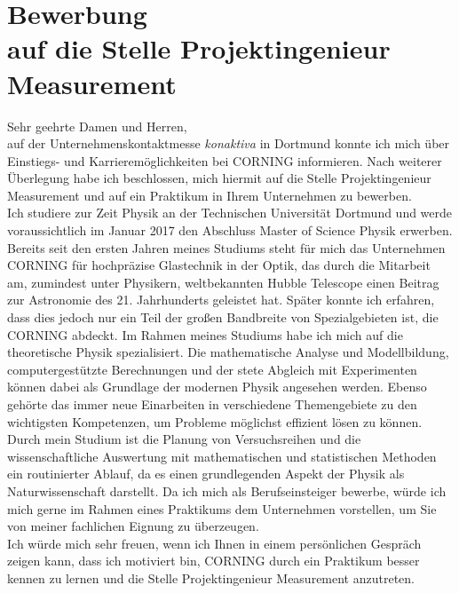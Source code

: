 \documentclass[12pt]{scrartcl}
\begin{document}
\pagestyle{empty}

\section*{Bewerbung \\
auf die Stelle Projektingenieur Measurement}

\vspace{0.7in}

Sehr geehrte Damen und Herren,
\\

auf der Unternehmenskontaktmesse \textit{konaktiva} in Dortmund konnte 
ich mich über Ein\-stiegs- und 
Karrieremöglichkeiten bei CORNING informieren. Nach 
weiterer Überlegung habe ich beschlossen, mich hiermit auf 
die Stelle Projektingenieur Measurement und auf ein Praktikum in 
Ihrem Unternehmen zu bewerben.
\\

Ich studiere zur Zeit Physik an der Technischen Universität Dortmund und 
werde voraussichtlich im Januar 2017 den Abschluss Master of Science Physik 
erwerben. Bereits seit den ersten Jahren meines Studiums steht für mich 
das Unternehmen CORNING für hochpräzise Glastechnik in der Optik, das durch 
die Mitarbeit am, zumindest unter Physikern, weltbekannten Hubble Telescope 
einen Beitrag zur Astronomie des 21. Jahrhunderts geleistet hat. Später konnte 
ich erfahren, dass dies jedoch nur ein Teil der großen Bandbreite von 
Spezialgebieten ist, die CORNING abdeckt. Im Rahmen meines Studiums habe ich 
mich auf die theoretische Physik spezialisiert. Die mathematische Analyse und 
Modellbildung, computergestützte Berechnungen und der stete Abgleich mit 
Experimenten können dabei als Grundlage der modernen Physik 
angesehen werden. Ebenso gehörte das immer neue Einarbeiten in 
verschiedene Themengebiete zu den wichtigsten Kompetenzen, um Probleme möglichst 
effizient lösen zu können. Durch mein Studium ist die Planung von 
Versuchsreihen und die wissenschaftliche Auswertung mit mathematischen und 
statistischen Methoden ein routinierter Ablauf, da es einen grundlegenden 
Aspekt der Physik als Naturwissenschaft darstellt. Da ich mich als Berufseinsteiger bewerbe, würde ich mich gerne 
im Rahmen eines Praktikums dem Unternehmen vorstellen, um Sie von meiner 
fachlichen Eignung zu überzeugen.
\\

Ich würde mich sehr freuen, wenn ich Ihnen in einem persönlichen Gespräch 
zeigen kann, dass ich motiviert bin, CORNING durch ein Praktikum 
besser kennen zu lernen und die Stelle Projektingenieur Measurement 
anzutreten.
\\
\end{document}
